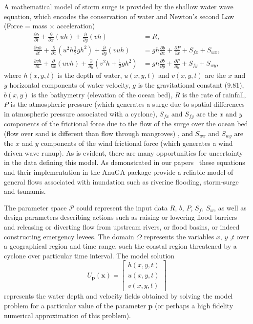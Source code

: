 A mathematical model of storm surge is provided 
by the shallow water wave equation,  which encodes the conservation of water and Newton's second Law (Force = mass $\times$ acceleration) 
\begin{align*}
\frac{\partial h}{\partial t} +
\frac{\partial }{\partial x} \left(uh\right) + \frac{\partial }{\partial y} \left(vh\right) &= R, \\
\frac{\partial uh}{\partial t} +
\frac{\partial }{\partial x} \left(u^2h  \frac12 gh^2 \right) 
+ \frac{\partial }{\partial y} \left(vuh\right) &= gh \frac{\partial b}{\partial x} 
+ \frac{\partial P}{\partial  x} + S_{fx} + S_{wx} ,\\
\frac{\partial vh}{\partial t} +
\frac{\partial }{\partial x} \left(uvh  \right) 
+ \frac{\partial }{\partial y} \left(v^2h + \frac12 g h^2 \right) &= gh \frac{\partial b}{\partial y} 
+ \frac{\partial P}{\partial  y} + S_{fy} + S_{wy},
\end{align*}
where $h(x,y,t)$ is the depth of water, $u(x,y,t)$ and $v(x,y,t)$ are the $x$ and $y$ horizontal components of water velocity, $g$ is the gravitational constant (9.81), $b(x,y)$ is the bathymetry (elevation of the ocean bed), $R$ is the rate of rainfall, $P$ is the atmospheric pressure (which generates a surge due to spatial differences in atmospheric pressure associated with a cyclone), $S_{fx}$ and $S_{fy}$ are the $x$ and $y$ components of the frictional force due to the flow of the surge over the ocean bed (flow over sand is different than flow through mangroves) , and $S_{wx}$ and $S_{wy}$ are the $x$ and $y$ components of the wind  frictional force (which generates a wind driven wave runup). As is evident, there are many opportunities for uncertainty in the data defining this model. 
As demonstrated in our papers~\parencite{anugamanual,nielsen2005hydrodynamic}  these
equations and their implementation in the AnuGA package provide a reliable
model of general flows associated with inundation such as riverine flooding, storm-surge 
and tsunamis.

The parameter space $\mathcal{P}$ could represent the input data $R$, $b$, $P$, $S_f$, $S_w$, as well as design parameters describing actions such as raising or lowering flood barriers and releasing or diverting flow from upstream rivers, or flood basins, or indeed constructing emergency levees. 
The domain $\Omega$ represents the variables $x$, $y$ ,$t$ over a geographical region and time range, such the coastal region threatened by a cyclone over particular time interval. The model solution 
$$
U_{\mathbf{p}} (\mathbf{x})  = \begin{bmatrix} h(x,y,t) \\ u(x,y,t) \\ v(x,y,t) \end{bmatrix}
$$
represents the water depth and velocity fields obtained by solving the model problem for a particular value of the parameter $\mathbf{p}$ (or perhaps a high fidelity numerical approximation of this problem). 









